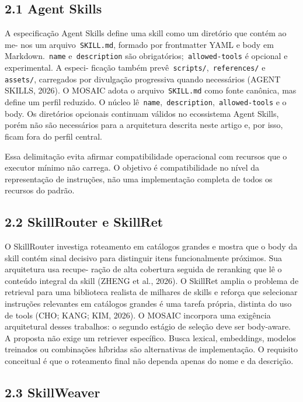 \documentclass[12pt,a4paper]{article}
\begin{document}
\subsection*{2.1 Agent Skills}

A especificação Agent Skills define uma skill como um diretório que contém ao me- nos um arquivo\texttt{ SKILL.md}, formado por frontmatter YAML e body em Markdown.\texttt{ name} e\texttt{ description} são obrigatórios;\texttt{ allowed-tools} é opcional e experimental. A especi- ficação também prevê\texttt{ scripts/},\texttt{ references/} e\texttt{ assets/}, carregados por divulgação progressiva quando necessários (AGENT SKILLS, 2026). O MOSAIC adota o arquivo\texttt{ SKILL.md} como fonte canônica, mas define um perfil reduzido. O núcleo lê\texttt{ name},\texttt{ description},\texttt{ allowed-tools} e o body. Os diretórios opcionais continuam válidos no ecossistema Agent Skills, porém não são necessários para a arquitetura descrita neste artigo e, por isso, ficam fora do perfil central.


Essa delimitação evita afirmar compatibilidade operacional com recursos que o executor mínimo não carrega. O objetivo é compatibilidade no nível da representação de instruções, não uma implementação completa de todos os recursos do padrão.


\subsection*{2.2 SkillRouter e SkillRet}

O SkillRouter investiga roteamento em catálogos grandes e mostra que o body da skill contém sinal decisivo para distinguir itens funcionalmente próximos. Sua arquitetura usa recupe- ração de alta cobertura seguida de reranking que lê o conteúdo integral da skill (ZHENG et al., 2026). O SkillRet amplia o problema de retrieval para uma biblioteca realista de milhares de skills e reforça que selecionar instruções relevantes em catálogos grandes é uma tarefa própria, distinta do uso de tools (CHO; KANG; KIM, 2026). O MOSAIC incorpora uma exigência arquitetural desses trabalhos: o segundo estágio de seleção deve ser body-aware. A proposta não exige um retriever específico. Busca lexical, embeddings, modelos treinados ou combinações híbridas são alternativas de implementação. O requisito conceitual é que o roteamento final não dependa apenas do nome e da descrição.


\subsection*{2.3 SkillWeaver}
\end{document}
